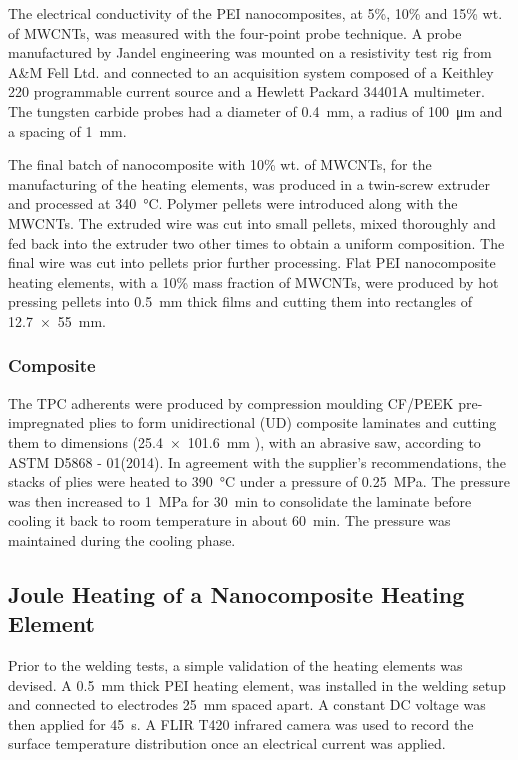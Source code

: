 \documentclass[11pt,review,times]{elsarticle}
\begin{document}
The electrical conductivity of the PEI nanocomposites, at 5\%, 10\% and 15\% wt. of MWCNTs, was measured with the four-point probe technique. 
A probe manufactured by Jandel engineering was mounted on a resistivity test rig from A\&M Fell Ltd. and connected to an acquisition system composed of a Keithley 220 programmable current source and a Hewlett Packard 34401A multimeter. 
The tungsten carbide probes had a diameter of \SI{0.4}{\mm}, a radius of \SI{100}{\um} and a spacing of \SI{1}{\mm}. 

The final batch of nanocomposite with 10\% wt. of MWCNTs, for the manufacturing of the heating elements, was produced in a twin-screw extruder and processed at \SI{340}{\celsius}. 
Polymer pellets were introduced along with the MWCNTs. 
The extruded wire was cut into small pellets, mixed thoroughly and fed back into the extruder two other times to obtain a uniform composition. 
The final wire was cut into pellets prior further processing. 
Flat PEI nanocomposite heating elements, with a 10\% mass fraction of MWCNTs, were produced by hot pressing pellets into \SI{0.5}{\milli\metre} thick films and cutting them into rectangles of \SI{12.7 x 55}{\milli\metre}. 

\subsubsection{Composite}

The TPC adherents were produced by compression moulding CF/PEEK pre-impregnated plies to form unidirectional (UD) composite laminates and cutting them to dimensions (\SI{25.4 x 101.6}{\milli\metre} ), with an abrasive saw, according to ASTM D5868 - 01(2014). 
In agreement with the supplier’s recommendations, the stacks of plies were heated to \SI{390}{\celsius} under a pressure of \SI{0.25}{\MPa}. 
The pressure was then increased to \SI{1}{\MPa} for \SI{30}{\minute} to consolidate the laminate before cooling it back to room temperature in about \SI{60}{\minute}. 
The pressure was maintained during the cooling phase. 

\subsection{Joule Heating of a Nanocomposite Heating Element}

Prior to the welding tests, a simple validation of the heating elements was devised. 
A \SI{0.5}{\milli\metre} thick PEI heating element, was installed in the welding setup and connected to electrodes \SI{25}{\mm} spaced apart. 
A constant DC voltage was then applied for \SI{45}{\s}. 
A FLIR T420 infrared camera was used to record the surface temperature distribution once an electrical current was applied. 
\end{document}
